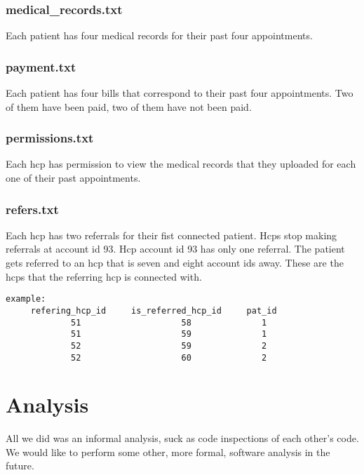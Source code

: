 \subsection{medical\_records.txt}
Each patient has four medical records for their past four appointments.

\subsection{payment.txt}
Each patient has four bills that correspond to their past four appointments.  Two of them have been paid, two of them have not been paid.

\subsection{permissions.txt}
Each hcp has permission to view the medical records that they uploaded for each one of their past appointments.

\subsection{refers.txt}
Each hcp has two referrals for their fist connected patient.  Hcps stop making referrals at account id 93.  Hcp account id 93 has only one referral.  The patient gets referred to an hcp that is seven and eight account ids away. These are the hcps that the referring hcp is connected with.
\begin{verbatim}
example:
     refering_hcp_id     is_referred_hcp_id     pat_id	
             51                    58              1
             51                    59              1
             52                    59              2
             52                    60              2
\end{verbatim}

\chapter{Analysis}
All we did was an informal analysis, suck as code inspections of each other's code. We would like to perform some other, more formal, software analysis in the future.